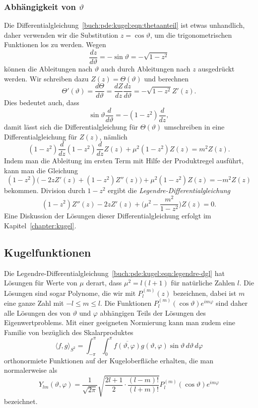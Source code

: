 \subsubsection{Abhängigkeit von $\vartheta$}
Die Differentialgleichung~\eqref{buch:pde:kugel:eqn:thetaanteil}
ist etwas unhandlich, daher verwenden wir die Substitution $z=\cos\vartheta$,
um die trigonometrischen Funktionen los zu werden.
Wegen
\[
\frac{dz}{d\vartheta} = -\sin\vartheta =-\sqrt{1-z^2}
\]
können die Ableitungen nach $\vartheta$ auch durch Ableitungen nach $z$
ausgedrückt werden.
Wir schreiben dazu $Z(z)=\Theta(\vartheta)$ und berechnen 
\[
\Theta'(\vartheta)
=
\frac{d\Theta}{d\vartheta}
=
\frac{dZ}{dz}\frac{dz}{d\vartheta}
=
-
\sqrt{1-z^2}
Z'(z).
\]
Dies bedeutet auch, dass
\[
\sin\vartheta\frac{d}{d\vartheta}
=
-
(1-z^2)\frac{d}{dz},
\]
damit lässt sich die Differentialgleichung für $\Theta(\vartheta)$ umschreiben
in eine Differentialgleichung für $Z(z)$, nämlich
\[
(1-z^2)\frac{d}{dz}(1-z^2)\frac{d}{dz} Z(z)
+
\mu^2
(1-z^2)
Z(z)
=
m^2
Z(z).
\]
Indem man die Ableitung im ersten Term mit Hilfe der Produktregel
ausführt, kann man die Gleichung
\[
(1-z^2)\biggl(
-2zZ'(z) + (1-z^2)Z''(z)
\biggr)
+
\mu^2(1-z^2)Z(z)
=
-m^2 Z(z)
\]
bekommen.
Division durch $1-z^2$ ergibt die
{\em Legendre-Differentialgleichung}
\begin{equation}
(1-z^2)Z''(z)
-2zZ'(z)
+
\biggl(
\mu^2 - \frac{m^2}{1-z^2}
\biggr)
Z(z)
=
0.
\label{buch:pde:kugel:eqn:legendre-dgl}
\end{equation}
Eine Diskussion der Lösungen dieser Differentialgleichung erfolgt im
Kapitel~\ref{chapter:kugel}.

\subsection{Kugelfunktionen}
Die Legendre-Differentialgleichung~\eqref{buch:pde:kugel:eqn:legendre-dgl}
hat Lösungen für Werte von $\mu$ derart, dass $\mu^2=l(l+1)$ für natürliche
Zahlen $l$.
Die Lösungen sind sogar Polynome, die wir mit $P_l^{(m)}(z)$ 
bezeichnen, dabei ist $m$ eine ganze Zahl mit $-l\le m\le l$.
Die Funktionen $P_l^{(m)}(\cos\vartheta)e^{im\varphi}$ 
sind daher alle Lösungen des von $\vartheta$ und $\varphi$
abhängigen Teils der Lösungen des Eigenwertproblems.
Mit einer geeigneten Normierung kann man zudem eine Familie von
bezüglich des Skalarproduktes
\[
\langle f,g\rangle_{S^2}
=
\int_{-\pi}^{\pi}
\int_{0}^{\pi}
\overline{f(\vartheta,\varphi)}
g(\vartheta,\varphi)
\sin\vartheta
\,d\vartheta
\,d\varphi
\]
orthonormiete Funktionen auf der Kugeloberfläche erhalten, die
man normalerweise als 
\[
Y_{lm}(\vartheta,\varphi)
=
\frac{1}{\sqrt{2\pi}}
\sqrt{
\frac{2l+1}{2}\cdot
\frac{(l-m)!}{(l+m)!}
}
P_{l}^{(m)}(\cos\vartheta)e^{im\varphi}
\]
bezeichnet.





